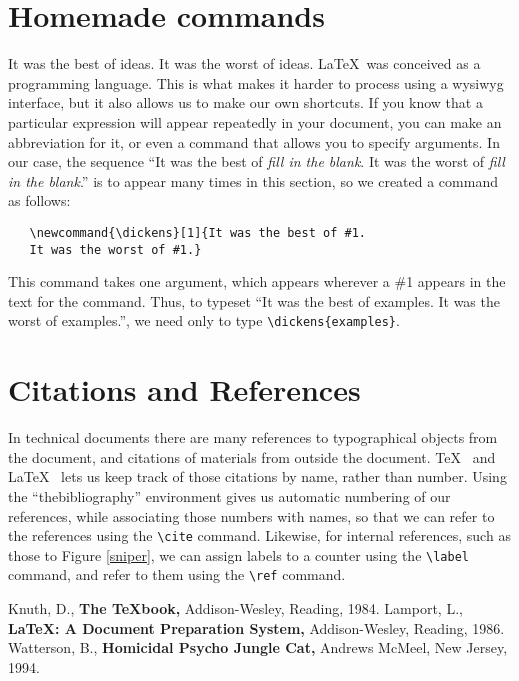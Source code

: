 \documentclass[12pt]{article}
\begin{document}
\section{Homemade commands}
\newcommand{\dickens}[1]{It was the best of #1. It was the worst of #1.}
\dickens{ideas}
\LaTeX\ was conceived as a programming language.  This is what makes it
harder to process using a wysiwyg interface, but it also allows
us to make our own shortcuts.
If you know that a particular expression will appear repeatedly
in your document, you can make an abbreviation for it, or even
a command that allows you to specify arguments.  In our case,
the sequence ``\dickens{{\it fill in the blank}}''
is to appear many times in this section, so we created a command
as follows:
\begin{verbatim}
   \newcommand{\dickens}[1]{It was the best of #1. 
   It was the worst of #1.}
\end{verbatim}
This command takes one argument, which appears wherever a \#1 appears
in the text for the command.  Thus, to typeset ``\dickens{examples}'',
we need only to type \verb(\dickens{examples}(.

\section{Citations and References}
In technical documents there are many references to 
typographical objects from the document, and citations
of materials from outside the document.  \TeX\ \cite{knuth}
and \LaTeX\ \cite{lamport} lets us keep track of those citations
by name, rather than number.  Using the ``thebibliography'' 
environment gives us automatic numbering of our references,
while associating those numbers with names, so that we can
refer to the references using the \verb(\cite( command.
Likewise, for internal references, such as those to Figure \ref{sniper},
we can assign labels to a counter using the \verb(\label(
command, and refer to them using the \verb(\ref( command.

\begin{thebibliography}{X}
    Knuth, D., {\bf The \TeX book,} Addison-Wesley, Reading, 1984.
    Lamport, L., {\bf \LaTeX: A Document Preparation System,}
   Addison-Wesley, Reading, 1986.
    Watterson, B., {\bf Homicidal Psycho Jungle Cat,}
   Andrews McMeel, New Jersey, 1994.
\end{thebibliography}
\end{document}
